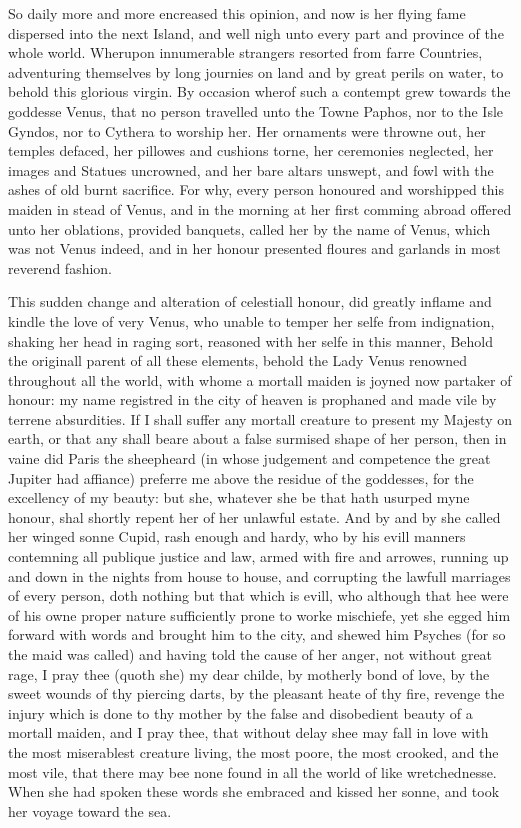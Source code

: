 So daily more and more encreased this opinion, and now is her flying fame
dispersed into the next Island, and well nigh unto every part and province of
the whole world. Wherupon innumerable strangers resorted from farre Countries,
adventuring themselves by long journies on land and by great perils on water,
to behold this glorious virgin. By occasion wherof such a contempt grew towards
the goddesse Venus, that no person travelled unto the Towne Paphos, nor to the
Isle Gyndos, nor to Cythera to worship her. Her ornaments were throwne out, her
temples defaced, her pillowes and cushions torne, her ceremonies neglected, her
images and Statues uncrowned, and her bare altars unswept, and fowl with the
ashes of old burnt sacrifice. For why, every person honoured and worshipped
this maiden in stead of Venus, and in the morning at her first comming abroad
offered unto her oblations, provided banquets, called her by the name of Venus,
which was not Venus indeed, and in her honour presented floures and garlands in
most reverend fashion.

This sudden change and alteration of celestiall honour, did greatly inflame and
kindle the love of very Venus, who unable to temper her selfe from indignation,
shaking her head in raging sort, reasoned with her selfe in this manner, Behold
the originall parent of all these elements, behold the Lady Venus renowned
throughout all the world, with whome a mortall maiden is joyned now partaker of
honour: my name registred in the city of heaven is prophaned and made vile by
terrene absurdities. If I shall suffer any mortall creature to present my
Majesty on earth, or that any shall beare about a false surmised shape of her
person, then in vaine did Paris the sheepheard (in whose judgement and
competence the great Jupiter had affiance) preferre me above the residue of the
goddesses, for the excellency of my beauty: but she, whatever she be that hath
usurped myne honour, shal shortly repent her of her unlawful estate. And by and
by she called her winged sonne Cupid, rash enough and hardy, who by his evill
manners contemning all publique justice and law, armed with fire and arrowes,
running up and down in the nights from house to house, and corrupting the
lawfull marriages of every person, doth nothing but that which is evill, who
although that hee were of his owne proper nature sufficiently prone to worke
mischiefe, yet she egged him forward with words and brought him to the city,
and shewed him Psyches (for so the maid was called) and having told the cause
of her anger, not without great rage, I pray thee (quoth she) my dear childe,
by motherly bond of love, by the sweet wounds of thy piercing darts, by the
pleasant heate of thy fire, revenge the injury which is done to thy mother by
the false and disobedient beauty of a mortall maiden, and I pray thee, that
without delay shee may fall in love with the most miserablest creature living,
the most poore, the most crooked, and the most vile, that there may bee none
found in all the world of like wretchednesse. When she had spoken these words
she embraced and kissed her sonne, and took her voyage toward the sea.

